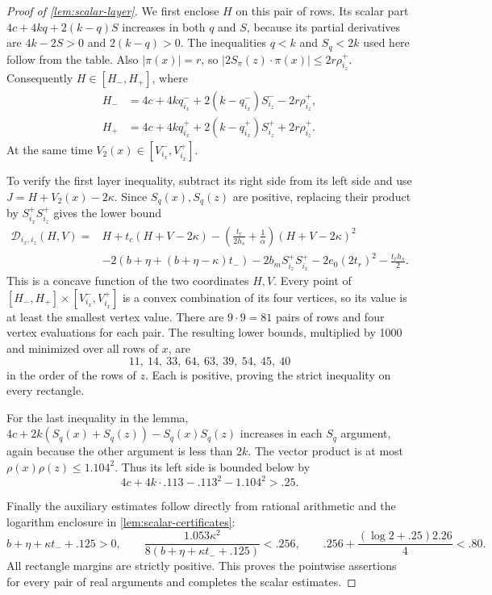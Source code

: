 \begin{proof}[Proof of \cref{lem:scalar-layer}]
We first enclose $H$ on this pair of rows. Its scalar part $4c+4kq+2(k-q)S$ increases in both $q$ and $S$, because its partial derivatives are $4k-2S>0$ and $2(k-q)>0$. The inequalities $q<k$ and $S_q<2k$ used here follow from the table. Also $|\pi(x)|=r$, so $|2S_\pi(z)\cdot\pi(x)|\le2r\rho_{i_z}^+$. Consequently $H\in[H_-,H_+]$, where
\[
\begin{aligned}
 H_-&=4c+4kq_{i_x}^-+
        2(k-q_{i_x}^-)S_{i_z}^- -2r\rho_{i_z}^+,\\
 H_+&=4c+4kq_{i_x}^++
        2(k-q_{i_x}^+)S_{i_z}^+ +2r\rho_{i_z}^+.
\end{aligned}
\]
At the same time $V_2(x)\in[V_{i_x}^-,V_{i_x}^+]$.

To verify the first layer inequality, subtract its right side from its left side and use $J=H+V_2(x)-2\kappa$. Since $S_q(x),S_q(z)$ are positive, replacing their product by $S_{i_x}^+S_{i_z}^+$ gives the lower bound
\[
\begin{aligned}
 \mathscr{D}_{i_x,i_z}(H,V)
 ={}&H+t_c(H+V-2\kappa)
       -\left(\frac{t_r}{2h_s}+\frac1\alpha\right)
          (H+V-2\kappa)^2\\
 &-2(b+\eta+(b+\eta-\kappa)t_-)
   -2b_mS_{i_z}^+S_{i_x}^+
   -2e_0(2t_r)^2-\frac{t_rh_s}{2}.
\end{aligned}
\]
This is a concave function of the two coordinates $H,V$. Every point of $[H_-,H_+]\times[V_{i_x}^-,V_{i_x}^+]$ is a convex combination of its four vertices, so its value is at least the smallest vertex value. There are $9\cdot9=81$ pairs of rows and four vertex evaluations for each pair. The resulting lower bounds, multiplied by 1000 and minimized over all rows of $x$, are
\[
 11,\ 14,\ 33,\ 64,\ 63,\ 39,\ 54,\ 45,\ 40
\]
in the order of the rows of $z$. Each is positive, proving the strict inequality on every rectangle.

For the last inequality in the lemma, $4c+2k(S_q(x)+S_q(z))-S_q(x)S_q(z)$ increases in each $S_q$ argument, again because the other argument is less than $2k$. The vector product is at most $\rho(x)\rho(z)\le1.104^2$. Thus its left side is bounded below by
\[
 4c+4k\cdot.113-.113^2-1.104^2>.25.
\]


Finally the auxiliary estimates follow directly from rational arithmetic and the logarithm enclosure in \cref{lem:scalar-certificates}:
\[
 b+\eta+\kappa t_-+.125>0,\qquad
 \frac{1.053\kappa^2}{8(b+\eta+\kappa t_-+.125)}<.256,
 \qquad .256+\frac{(\log2+.25)2.26}{4}<.80.
\]
All rectangle margins are strictly positive. This proves the pointwise assertions for every pair of real arguments and completes the scalar estimates.
\end{proof}
